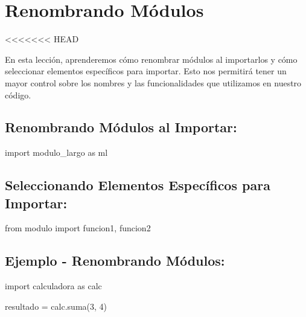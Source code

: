 \documentclass[
  a4paper,
  DIV=11,
  numbers=noendperiod,
  onepage,
  openany]{scrreprt}
\newenvironment{Shaded}{\begin{snugshade}}{\end{snugshade}}
\newcommand{\DecValTok}[1]{\textcolor[rgb]{0.68,0.00,0.00}{#1}}
\newcommand{\ImportTok}[1]{\textcolor[rgb]{0.00,0.46,0.62}{#1}}
\newcommand{\NormalTok}[1]{\textcolor[rgb]{0.00,0.23,0.31}{#1}}
\newcommand{\OperatorTok}[1]{\textcolor[rgb]{0.37,0.37,0.37}{#1}}
\begin{document}
\hypertarget{renombrando-muxf3dulos}{%
\chapter{Renombrando Módulos}\label{renombrando-muxf3dulos}}

\textless\textless\textless\textless\textless\textless\textless{} HEAD

En esta lección, aprenderemos cómo renombrar módulos al importarlos y
cómo seleccionar elementos específicos para importar. Esto nos permitirá
tener un mayor control sobre los nombres y las funcionalidades que
utilizamos en nuestro código.

\hypertarget{renombrando-muxf3dulos-al-importar}{%
\section{Renombrando Módulos al
Importar:}\label{renombrando-muxf3dulos-al-importar}}

\begin{Shaded}
\begin{Highlighting}[]
\ImportTok{import}\NormalTok{ modulo\_largo }\ImportTok{as}\NormalTok{ ml}
\end{Highlighting}
\end{Shaded}

\hypertarget{seleccionando-elementos-especuxedficos-para-importar}{%
\section{Seleccionando Elementos Específicos para
Importar:}\label{seleccionando-elementos-especuxedficos-para-importar}}

\begin{Shaded}
\begin{Highlighting}[]
\ImportTok{from}\NormalTok{ modulo }\ImportTok{import}\NormalTok{ funcion1, funcion2}
\end{Highlighting}
\end{Shaded}

\hypertarget{ejemplo---renombrando-muxf3dulos}{%
\section{Ejemplo - Renombrando
Módulos:}\label{ejemplo---renombrando-muxf3dulos}}

\begin{Shaded}
\begin{Highlighting}[]
\ImportTok{import}\NormalTok{ calculadora }\ImportTok{as}\NormalTok{ calc}

\NormalTok{resultado }\OperatorTok{=}\NormalTok{ calc.suma(}\DecValTok{3}\NormalTok{, }\DecValTok{4}\NormalTok{)}
\end{Highlighting}
\end{Shaded}
\end{document}
